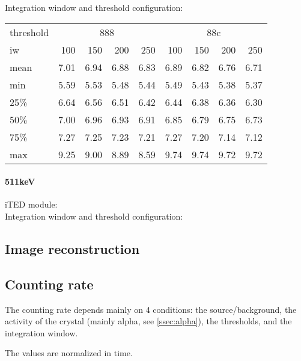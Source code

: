 Integration window and threshold configuration:\\

\begin{tabular}{lrrrrrrrr}
    \toprule
    threshold & \multicolumn{4}{c}{888} & \multicolumn{4}{c}{88c} \\
    iw &  100 &  150 &  200 &  250 &  100 &  150 &  200 &  250 \\
    \midrule
    mean & 7.01 & 6.94 & 6.88 & 6.83 & 6.89 & 6.82 & 6.76 & 6.71 \\
    min  & 5.59 & 5.53 & 5.48 & 5.44 & 5.49 & 5.43 & 5.38 & 5.37 \\
    25\%  & 6.64 & 6.56 & 6.51 & 6.42 & 6.44 & 6.38 & 6.36 & 6.30 \\
    50\%  & 7.00 & 6.96 & 6.93 & 6.91 & 6.85 & 6.79 & 6.75 & 6.73 \\
    75\%  & 7.27 & 7.25 & 7.23 & 7.21 & 7.27 & 7.20 & 7.14 & 7.12 \\
    max  & 9.25 & 9.00 & 8.89 & 8.59 & 9.74 & 9.74 & 9.72 & 9.72 \\
    \bottomrule
\end{tabular}

\paragraph*{511keV}

iTED module:\\

Integration window and threshold configuration:\\

\subsection{Image reconstruction}

\subsection{Counting rate}

The counting rate depends mainly on 4 conditions: the source/background, the activity of the crystal (mainly alpha, see \ref{ssec:alpha}), the thresholds, and the integration window.


The values are normalized in time.

